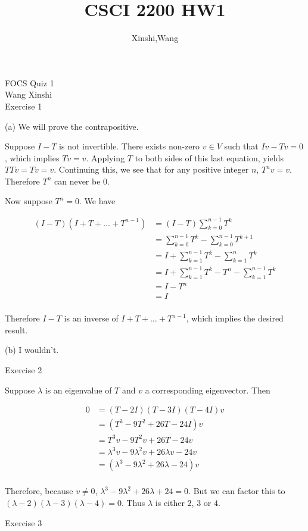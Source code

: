 \documentclass{article}
\title{CSCI 2200 HW1}
\author{Xinshi,Wang}
\begin{document}
\noindent
FOCS Quiz 1 \\
Wang Xinshi\\

Exercise 1

(a) We will prove the contrapositive.

Suppose $I - T$ is not invertible. There exists non-zero $v \in V$ such that $Iv - Tv = 0$, which implies $Tv = v$. Applying $T$ to both sides of this last equation, yields $TTv = Tv = v$. Continuing this, we see that for any positive integer $n$, $T^n v = v$. Therefore $T^n$ can never be $0$.

Now suppose $T^n = 0$. We have

$$ \begin{aligned} (I - T)(I + T + \dots + T^{n-1}) &= (I - T) \sum\limits_{k=0}^{n-1} T^k\\ &= \sum\limits_{k=0}^{n-1} T^k - \sum\limits_{k=0}^{n-1} T^{k + 1}\\ &= I + \sum\limits_{k=1}^{n-1} T^k - \sum\limits_{k=1}^n T^k\\ &= I + \sum\limits_{k=1}^{n-1} T^k - T^n - \sum\limits_{k=1}^{n-1} T^k\\ &= I - T^n\\ &= I\\ \end{aligned} $$

Therefore $I - T$ is an inverse of $I + T + \dots + T^{n-1}$, which implies the desired result.

(b) I wouldn't.

Exercise 2

Suppose $\lambda$ is an eigenvalue of $T$ and $v$ a corresponding eigenvector. Then

$$ \begin{aligned} 0 &= (T - 2I)(T - 3I)(T - 4I)v\\ &= (T^3 - 9T^2 + 26T - 24I)v\\ &= T^3 v - 9T^2 v + 26T - 24v\\ &= \lambda^3 v - 9\lambda^2 v + 26\lambda v - 24v\\ &= (\lambda^3 - 9\lambda^2 + 26\lambda - 24)v\\ \end{aligned} $$

Therefore, because $v \neq 0$, $\lambda^3 - 9\lambda^2 + 26\lambda + 24 = 0$. But we can factor this to $(\lambda - 2)(\lambda - 3)(\lambda - 4) = 0$. Thus $\lambda$ is either $2$, $3$ or $4$.

Exercise 3
\end{document}
